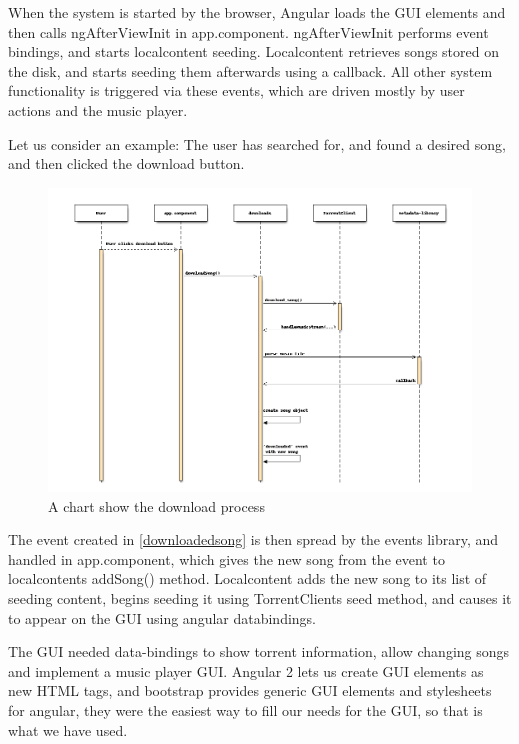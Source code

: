 When the system is started by the browser,
Angular loads the \acs{GUI} elements and then calls ngAfterViewInit in app.component.
ngAfterViewInit performs event bindings, and starts localcontent seeding.
Localcontent retrieves songs stored on the disk, and starts seeding them afterwards using a callback.
All other system functionality is triggered via these events, 
which are driven mostly by user actions and the music player.
\newline

Let us consider an example: The user has searched for, 
and found a desired song, and then clicked the download button.

\begin{figure}[H]
	\centerline{
	\includegraphics[width=1.5\linewidth]{gfx/downloadsong.png}
	}
	\caption{A chart show the download process}
	\label{fig:downloadsong}
\end{figure}

The event created in \ref{downloadedsong} is then spread by the events library,
and handled in app.component, 
which gives the new song from the event to localcontents addSong() method.
Localcontent adds the new song to its list of seeding content, 
begins seeding it using TorrentClients seed method,
and causes it to appear on the \acs{GUI} using angular databindings.
\newline

The \acs{GUI} needed data-bindings to show torrent information, allow changing songs
and implement a music player \acs{GUI}. 
Angular 2 lets us create \acs{GUI} elements as new \acs{HTML} tags, 
and bootstrap provides generic \acs{GUI} elements and stylesheets for angular, 
they were the easiest way to fill our needs for the \acs{GUI},
so that is what we have used.

